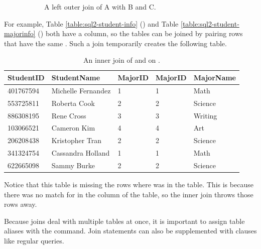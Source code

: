 \begin{figure}[H]
\begin{subfigure}{.4\textwidth}
    \caption{A left outer join of A with B and C.}
    \label{fig:sql2-left-join}
\end{subfigure}
%
\caption{}
\label{fig:joins}
\end{figure}

For example, Table \ref{table:sql2-student-info} () and Table \ref{table:sql2-student-majorinfo} () both have a  column, so the tables can be joined by pairing rows that have the same .
Such a join temporarily creates the following table.

\begin{table}[H]
\centering
\footnotesize
\begin{tabular}{|l|l|l|l|l|}
    \hline StudentID & StudentName & MajorID & MajorID & MajorName \\ \hline
    401767594 & Michelle Fernandez & 1 & 1 & Math \\
    553725811 & Roberta Cook & 2 & 2 & Science \\
    886308195 & Rene Cross & 3 & 3 & Writing \\
    103066521 & Cameron Kim & 4 & 4 & Art \\
    206208438 & Kristopher Tran & 2 & 2 & Science \\
    341324754 & Cassandra Holland & 1 & 1 & Math \\
    622665098 & Sammy Burke & 2 & 2 & Science \\ \hline
\end{tabular}
\caption{An inner join of  and  on .}
\label{table:sql2-inner-join-temp}
\end{table}

Notice that this table is missing the rows where  was  in the  table.
This is because there was no match for  in the  column of the  table, so the inner join throws those rows away.

Because joins deal with multiple tables at once, it is important to assign table aliases with the  command.
Join statements can also be supplemented with  clauses like regular queries.

